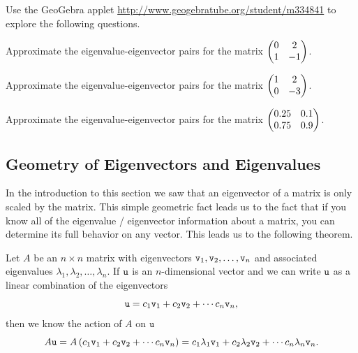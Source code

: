 % 
\begin{problem}
    Use the GeoGebra applet
    \href{http://www.geogebratube.org/student/m334841}{http://www.geogebratube.org/student/m334841}
    to explore the following questions.
    \ba
        \item Approximate the eigenvalue-eigenvector pairs for the matrix $\begin{pmatrix} 0 & 2 \\ 1
            & -1 \end{pmatrix}$.
        \item Approximate the eigenvalue-eigenvector pairs for the matrix $\begin{pmatrix} 1 & 2 \\ 0
            & -3 \end{pmatrix}$.
        \item Approximate the eigenvalue-eigenvector pairs for the matrix $\begin{pmatrix} 0.25 & 0.1
            \\ 0.75 & 0.9 \end{pmatrix}$.
    \ea

\end{problem}

\subsection{Geometry of Eigenvectors and Eigenvalues}
In the introduction to this section we saw that an eigenvector of a matrix is only scaled
by the matrix.  This simple geometric fact leads us to the fact that if you know all of
the eigenvalue / eigenvector information about a matrix, you can determine its full
behavior on any vector.  This leads us to the following theorem.

\begin{thm}\label{thm:10.6.eig1}
    Let $A$ be an $n \times n$ matrix with eigenvectors $\texttt{v}_1, \texttt{v}_2, \dots, \texttt{v}_n$ and
    associated eigenvalues $\lambda_1, \lambda_2, \dots, \lambda_n$.  If $\texttt{u}$ is an
    $n$-dimensional vector and we can write $\texttt{u}$ as a linear combination of the
    eigenvectors 
    \[ \texttt{u} = c_1 \texttt{v}_1 + c_2 \texttt{v}_2 + \cdots c_n \texttt{v}_n, \]
    then we know the action of $A$ on $\texttt{u}$
    \[ A\texttt{u} = A\left(c_1 \texttt{v}_1 + c_2 \texttt{v}_2 + \cdots c_n \texttt{v}_n\right) = c_1 \lambda_1 \texttt{v}_1
        + c_2 \lambda_2 \texttt{v}_2 + \cdots c_n \lambda_n \texttt{v}_n. \]
\end{thm}

